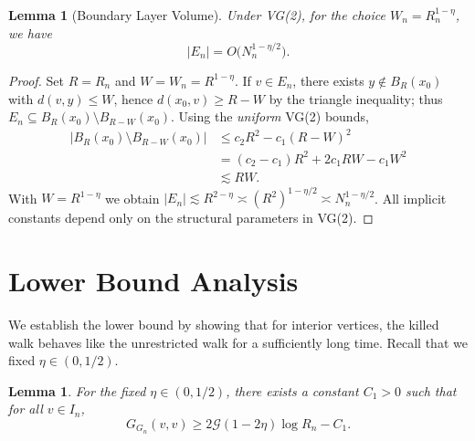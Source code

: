 \documentclass{article}
\numberwithin{equation}{section}
\newtheorem{lemma}[theorem]{Lemma}
\theoremstyle{definition}
\theoremstyle{remark}
\newcommand{\cG}{\mathcal{G}}
\begin{document}
\begin{lemma}[Boundary Layer Volume]\label{lem:boundary_volume}
Under VG(2), for the choice $W_n = R_n^{1-\eta}$, we have
\[
    |E_n| = O\bigl(N_n^{1-\eta/2}\bigr).
\]
\end{lemma}
\begin{proof}
Set $R=R_n$ and $W=W_n=R^{1-\eta}$. If $v\in E_n$, there exists $y\notin B_R(x_0)$ with $d(v,y)\le W$, hence
$d(x_0,v)\ge R-W$ by the triangle inequality; thus $E_n\subseteq B_R(x_0)\setminus B_{R-W}(x_0)$. Using the \emph{uniform} VG(2) bounds,
\begin{align*}
|B_R(x_0)\setminus B_{R-W}(x_0)| &\le c_2 R^2 - c_1 (R-W)^2 \\
  &= (c_2-c_1)R^2 + 2c_1 R W - c_1 W^2 \\
  &\lesssim R W.
\end{align*}
With $W=R^{1-\eta}$ we obtain $|E_n|\lesssim R^{2-\eta}\asymp (R^2)^{1-\eta/2} \asymp N_n^{1-\eta/2}$.
All implicit constants depend only on the structural parameters in VG(2).
\end{proof}

\section{Lower Bound Analysis}\label{sec:lower_bound}

We establish the lower bound by showing that for interior vertices, the killed walk behaves like the unrestricted walk for a sufficiently long time.
Recall that we fixed $\eta \in (0, 1/2)$.

\begin{lemma}\label{lem:lower}
For the fixed $\eta \in (0,1/2)$, there exists a constant $C_1 > 0$ such that for all $v \in I_n$,
\[
G_{G_n}(v,v) \geq 2\cG(1-2\eta)\log R_n - C_1.
\]
\end{lemma}
\end{document}
